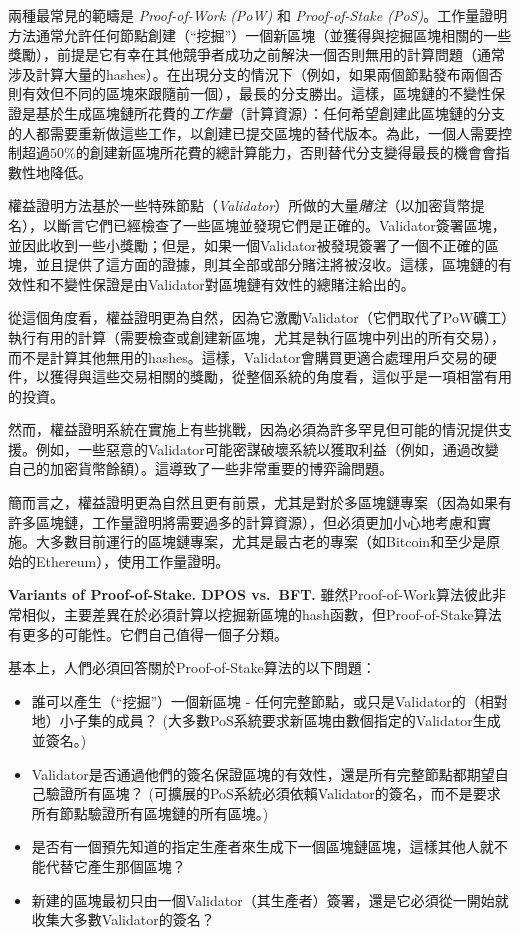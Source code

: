 \documentclass[12pt,oneside]{article}
\def\makepoint#1{\medbreak\noindent{\bf #1.\ }}
\def\nxsubpoint{\refstepcounter{subsubsection}%
  \smallbreak\makepoint{\thesubsubsection}}
\def\embt(#1.){\textbf{#1.}}
\begin{document}
兩種最常見的範疇是 {\em Proof-of-Work (PoW)} 和 {\em Proof-of-Stake (PoS)}。工作量證明方法通常允許任何節點創建（“挖掘”）一個新區塊（並獲得與挖掘區塊相關的一些獎勵），前提是它有幸在其他競爭者成功之前解決一個否則無用的計算問題（通常涉及計算大量的hashes）。在出現分支的情況下（例如，如果兩個節點發布兩個否則有效但不同的區塊來跟隨前一個），最長的分支勝出。這樣，區塊鏈的不變性保證是基於生成區塊鏈所花費的{\em 工作量}（計算資源）：任何希望創建此區塊鏈的分支的人都需要重新做這些工作，以創建已提交區塊的替代版本。為此，一個人需要控制超過$50\%$的創建新區塊所花費的總計算能力，否則替代分支變得最長的機會會指數性地降低。

權益證明方法基於一些特殊節點（{\em Validator}）所做的大量{\em 賭注}（以加密貨幣提名），以斷言它們已經檢查了一些區塊並發現它們是正確的。Validator簽署區塊，並因此收到一些小獎勵；但是，如果一個Validator被發現簽署了一個不正確的區塊，並且提供了這方面的證據，則其全部或部分賭注將被沒收。這樣，區塊鏈的有效性和不變性保證是由Validator對區塊鏈有效性的總賭注給出的。

從這個角度看，權益證明更為自然，因為它激勵Validator（它們取代了PoW礦工）執行有用的計算（需要檢查或創建新區塊，尤其是執行區塊中列出的所有交易），而不是計算其他無用的hashes。這樣，Validator會購買更適合處理用戶交易的硬件，以獲得與這些交易相關的獎勵，從整個系統的角度看，這似乎是一項相當有用的投資。

然而，權益證明系統在實施上有些挑戰，因為必須為許多罕見但可能的情況提供支援。例如，一些惡意的Validator可能密謀破壞系統以獲取利益（例如，通過改變自己的加密貨幣餘額）。這導致了一些非常重要的博弈論問題。

簡而言之，權益證明更為自然且更有前景，尤其是對於多區塊鏈專案（因為如果有許多區塊鏈，工作量證明將需要過多的計算資源），但必須更加小心地考慮和實施。大多數目前運行的區塊鏈專案，尤其是最古老的專案（如Bitcoin和至少是原始的Ethereum），使用工作量證明。

\nxsubpoint\label{sp:dpos.bft} \embt(Variants of Proof-of-Stake. DPOS
vs.\ BFT.) 雖然Proof-of-Work算法彼此非常相似，主要差異在於必須計算以挖掘新區塊的hash函數，但Proof-of-Stake算法有更多的可能性。它們自己值得一個子分類。

基本上，人們必須回答關於Proof-of-Stake算法的以下問題：
\begin{itemize}
\item 誰可以產生（“挖掘”）一個新區塊 - 任何完整節點，或只是Validator的（相對地）小子集的成員？ (大多數PoS系統要求新區塊由數個指定的Validator生成並簽名。)
\item Validator是否通過他們的簽名保證區塊的有效性，還是所有完整節點都期望自己驗證所有區塊？ (可擴展的PoS系統必須依賴Validator的簽名，而不是要求所有節點驗證所有區塊鏈的所有區塊。)
\item 是否有一個預先知道的指定生產者來生成下一個區塊鏈區塊，這樣其他人就不能代替它產生那個區塊？
\item 新建的區塊最初只由一個Validator（其生產者）簽署，還是它必須從一開始就收集大多數Validator的簽名？
\end{itemize}
\end{document}
